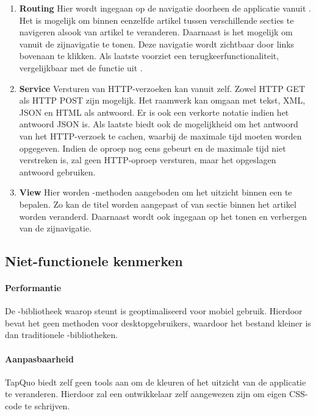 \begin{enumerate}
\item \textbf{Routing }
Hier wordt ingegaan op de navigatie doorheen de applicatie vanuit \js{}.
Het is mogelijk om binnen eenzelfde artikel tussen verschillende secties te navigeren alsook van artikel te veranderen.
Daarnaast is het mogelijk om vanuit \js{} de zijnavigatie te tonen.
Deze navigatie wordt zichtbaar door links bovenaan te klikken.
Als laatste voorziet \lungo{} een terugkeerfunctionaliteit, vergelijkbaar met de functie  uit \js{}.

\item \textbf{Service }
Versturen van HTTP-verzoeken kan vanuit \lungo{} zelf.
Zowel HTTP GET als HTTP POST zijn mogelijk.
Het raamwerk kan omgaan met tekst, XML, JSON en HTML als antwoord.
Er is ook een verkorte notatie indien het antwoord JSON is.
Als laatste biedt \lungo{} ook de mogelijkheid om het antwoord van het HTTP-verzoek te cachen, waarbij de maximale tijd moeten worden opgegeven.
Indien de oproep nog eens gebeurt en de maximale tijd niet verstreken is, zal \lungo{} geen HTTP-oproep versturen, maar het opgeslagen antwoord gebruiken.

\item \textbf{View }
Hier worden \js{}-methoden aangeboden om het uitzicht binnen een  te bepalen.
Zo kan de titel worden aangepast of van sectie binnen het artikel worden veranderd.
Daarnaast wordt ook ingegaan op het tonen en verbergen van de zijnavigatie.
 
\end{enumerate}

\subsection{Niet-functionele kenmerken}
\paragraph{Performantie}
De \js{}-bibliotheek waarop \lungo{} steunt is geoptimaliseerd voor mobiel gebruik.
Hierdoor bevat het geen methoden voor desktopgebruikers, waardoor het bestand kleiner is dan traditionele \js{}-bibliotheken.

\paragraph{Aanpasbaarheid}
\label{sec:lungo-aanpasbaarheid}
TapQuo biedt zelf geen tools aan om de kleuren of het uitzicht van de applicatie te veranderen.
Hierdoor zal een ontwikkelaar zelf aangewezen zijn om eigen CSS-code te schrijven.


